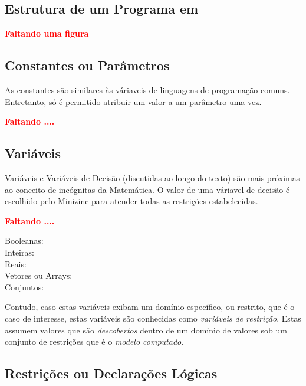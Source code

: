 \subsection{Estrutura de um Programa em \minizinc}

{\bf \textcolor{red}{Faltando uma figura}}

\subsection{Constantes ou Parâmetros}



As constantes são similares às váriaveis de linguagens de programação comuns. Entretanto, só é permitido atribuir 
um valor a um parâmetro uma vez.

{\bf \textcolor{red}{Faltando ....}}

\subsection{Variáveis}

Variáveis e Variáveis de Decisão (discutidas ao longo do texto) são mais próximas ao conceito de incógnitas da Matemática. O valor de uma váriavel de decisão 
é escolhido pelo Minizinc para atender todas as restrições estabelecidas.


{\bf \textcolor{red}{Faltando ....}}


\begin{description}

  \item[Booleanas:] 
    \item[Inteiras:]
      \item[Reais:]
        \item[Vetores ou Arrays:]
                \item[Conjuntos:]
                
\end{description}

Contudo, caso estas variáveis exibam um domínio
específico, ou restrito, que é o caso de interesse,
estas variáveis são conhecidas como
\textit{variáveis de restrição}.
Estas assumem valores que   são {\em descobertos} dentro de um domínio 
de valores sob um conjunto de restrições que 
é o  \textit{modelo  computado}.


\subsection{Restrições ou Declarações Lógicas}

